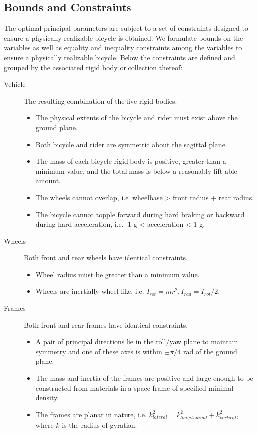 \documentclass{bmd2019a}
\begin{document}
\subsection{Bounds and Constraints}
%
The optimal principal parameters are subject to a set of constraints designed
to ensure a physically realizable bicycle is obtained. We formulate bounds on
the variables as well as equality and inequality constraints among the
variables to ensure a physically realizable bicycle. Below the constraints are
defined and grouped by the associated rigid body or collection thereof:
%
\begin{description}
  \item[Vehicle] The resulting combination of the five rigid bodies.
    \begin{itemize}
      \itemsep0em
      \item The physical extents of the bicycle and rider must exist above the
        ground plane.
      \item Both bicycle and rider are symmetric about the sagittal
        plane.
      \item The mass of each bicycle rigid body is positive, greater than a
        minimum value, and the total mass is below a reasonably lift-able
        amount.
      \item The wheels cannot overlap, i.e. wheelbase > front radius + rear
        radius.
      \item The bicycle cannot topple forward during hard braking or backward
        during hard acceleration, i.e. -1 g < acceleration < 1 g.
    \end{itemize}

  \item[Wheels] Both front and rear wheels have identical constraints.
    \begin{itemize}
      \itemsep0em
      \item Wheel radius must be greater than a minimum value.
      \item Wheels are inertially wheel-like, i.e.  $I_{rot}=mr^2,
        I_{rad}=I_{rot}/2$.
    \end{itemize}

  \item[Frames] Both front and rear frames have identical constraints.
    \begin{itemize}
      \itemsep0em
      \item A pair of principal directions lie in the roll/yaw
        plane to maintain symmetry and one of these axes is within $\pm \pi/4$
        rad of the ground plane.
      \item The mass and inertia of the frames are positive and large enough to
        be constructed from materials in a space frame of specified minimal
        density.
      \item The frames are planar in nature, i.e.
        $k_{lateral}^2=k_{longitudinal}^2+k_{vertical}^2$, where $k$ is the
        radius of gyration.
    \end{itemize}


\end{description}
\end{document}
